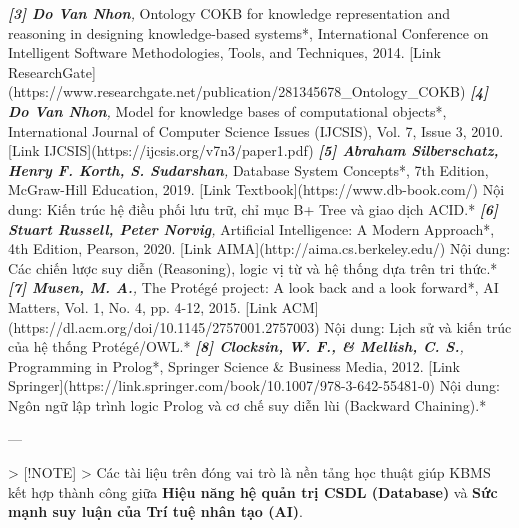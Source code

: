 \textit{   \textbf{[3] Do Van Nhon}, }Ontology COKB for knowledge representation and reasoning in designing knowledge-based systems*, International Conference on Intelligent Software Methodologies, Tools, and Techniques, 2014. [Link ResearchGate](https://www.researchgate.net/publication/281345678\_Ontology\_COKB)
\textit{   \textbf{[4] Do Van Nhon}, }Model for knowledge bases of computational objects*, International Journal of Computer Science Issues (IJCSIS), Vol. 7, Issue 3, 2010. [Link IJCSIS](https://ijcsis.org/v7n3/paper1.pdf)
\textit{   \textbf{[5] Abraham Silberschatz, Henry F. Korth, S. Sudarshan}, }Database System Concepts*, 7th Edition, McGraw-Hill Education, 2019. [Link Textbook](https://www.db-book.com/)
    \textit{   }Nội dung: Kiến trúc hệ điều phối lưu trữ, chỉ mục B+ Tree và giao dịch ACID.*
\textit{   \textbf{[6] Stuart Russell, Peter Norvig}, }Artificial Intelligence: A Modern Approach*, 4th Edition, Pearson, 2020. [Link AIMA](http://aima.cs.berkeley.edu/)
    \textit{   }Nội dung: Các chiến lược suy diễn (Reasoning), logic vị từ và hệ thống dựa trên tri thức.*
\textit{   \textbf{[7] Musen, M. A.}, }The Protégé project: A look back and a look forward*, AI Matters, Vol. 1, No. 4, pp. 4-12, 2015. [Link ACM](https://dl.acm.org/doi/10.1145/2757001.2757003)
    \textit{   }Nội dung: Lịch sử và kiến trúc của hệ thống Protégé/OWL.*
\textit{   \textbf{[8] Clocksin, W. F., \& Mellish, C. S.}, }Programming in Prolog*, Springer Science \& Business Media, 2012. [Link Springer](https://link.springer.com/book/10.1007/978-3-642-55481-0)
    \textit{   }Nội dung: Ngôn ngữ lập trình logic Prolog và cơ chế suy diễn lùi (Backward Chaining).*

---

> [!NOTE]
> Các tài liệu trên đóng vai trò là nền tảng học thuật giúp KBMS kết hợp thành công giữa \textbf{Hiệu năng hệ quản trị CSDL (Database)} và \textbf{Sức mạnh suy luận của Trí tuệ nhân tạo (AI)}.

